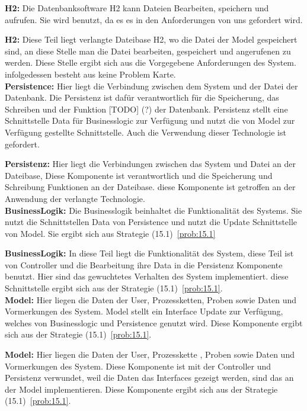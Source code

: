 \documentclass[enabledeprecatedfontcommands,fontsize=12pt,paper=a4,twoside]{scrartcl}
\begin{document}
{%
\textbf{H2:} Die Datenbanksoftware H2 kann Dateien Bearbeiten, speichern und aufrufen. Sie wird benutzt, da es es in den Anforderungen von uns gefordert wird. 
}

\textbf{H2:} Diese Teil liegt verlangte Dateibase H2, wo die Datei der Model gespeichert sind, an diese Stelle man die Datei bearbeiten, gespeichert und angerufenen zu werden. Diese Stelle ergibt sich aus die Vorgegebene Anforderungen des System. infolgedessen besteht aus keine Problem Karte.\\
{%
\textbf{Persistence:} Hier liegt die Verbindung zwischen dem System und der Datei der Datenbank. Die Persistenz ist dafür verantwortlich für die Speicherung, das Schreiben und der Funktion [TODO] (?) der Datenbank. Persistenz stellt eine Schnittstelle Data für Businesslogic zur Verfügung und nutzt die von Model zur Verfügung gestellte Schnittstelle. Auch die Verwendung dieser Technologie ist gefordert. 
}

\textbf{Persistenz:} Hier liegt die Verbindungen zwischen das System und Datei an der Dateibase, Diese Komponente ist verantwortlich und die Speicherung und Schreibung Funktionen an der Dateibase. diese Komponente  ist getroffen an der Anwendung der verlangte Technologie.   \\

{%
\textbf{BusinessLogik:} Die Businesslogik beinhaltet die Funktionalität des Systems. Sie nutzt die Schnittstellen Data von Persistence und nutzt die Update Schnittstelle von Model. Sie ergibt sich aus Strategie (15.1)~\ref{prob:15.1}
}

\textbf{BusinessLogik:} In diese Teil liegt die Funktionalität des System, diese Teil ist von Controller und die Bearbeitung ihre Data in die Persistenz Komponente benutzt. Hier sind das gewuchtetes Verhalten des System implementiert. diese Schnittstelle ergibt sich aus der  Strategie (15.1)~\ref{prob:15.1}.  \\

{%
\textbf{Model:} Hier liegen die Daten der User, Prozessketten, Proben sowie Daten und Vormerkungen des System. Model stellt ein Interface Update zur Verfügung, welches von Businesslogic und Persistence genutzt wird. Diese Komponente ergibt sich aus der Strategie (15.1)~\ref{prob:15.1}.\\
}

\textbf{Model:} Hier liegen die Daten der User, Prozesskette , Proben sowie Daten und Vormerkungen des System. Diese Komponente ist mit der Controller und Persistenz verwundet, weil die Daten das Interfaces gezeigt werden, sind das an der Model implementieren. Diese Komponente ergibt sich aus der Strategie (15.1)~\ref{prob:15.1}. \\
\end{document}
